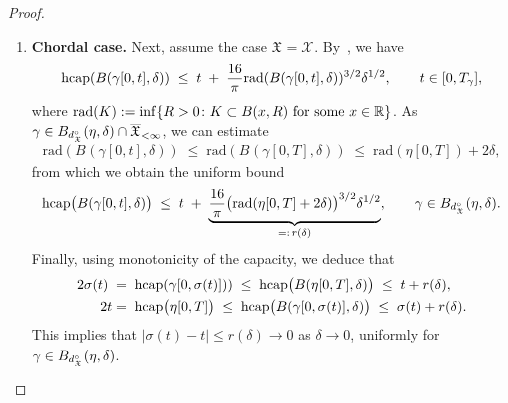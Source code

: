 \documentclass[a4paper, 11pt]{article}
\theoremstyle{definition}
\numberwithin{equation}{section}
\numberwithin{figure}{section}
\newcommand{\id}{\mathrm{\textnormal{id}}}
\newcommand{\Hpaths}[1][]{\mathscr{X}_{#1}} %
\newcommand{\Xpaths}[1][]{\mathfrak{X}_{#1}}
\newcommand{\Xfinpathscl}{\overline{\Xpaths}_{<\infty}}
\newcommand{\Bmetric}[3][]{B_{#1}(#2,#3)}%
\newcommand{\dXpathsUnparam}{d_{\Xpaths}^\circ}%
\newcommand{\rad}{\mathrm{rad}}
\begin{document}
\begin{proof}
\begin{enumerate}[leftmargin=*, label=\textnormal{(\roman*)}]
Thus, we have $g_{A^\gamma_t(r)}(\cdot) = (g_{A(r)} \circ g^\gamma_t)(\cdot) = r^{-1} g^\gamma_t(\cdot)$. 
By monotonicity, we thus obtain
\begin{align*}
e^{\tilde\sigma(t)} = (g^{\tilde\gamma}_{\tilde\sigma(t)})'(0) \le (g_{A^\gamma_{\sigma(t)}(r)})'(0) = r^{-1}e^{\sigma(t)}.
\end{align*}
Taking logarithms of both sides and rearranging yields $\tilde\sigma(t) - \sigma(t) \le - \log r$. 
By symmetry, we have $|\sigma(t)-\tilde\sigma(t)| \le -\log r$. 
Choosing $\tilde\gamma = \eta$ and $\tilde\sigma = \id$ thus gives
\begin{align*}
\sup_{s \in [0,T]}|s - \sigma(s)| 
\; \le \; -\log r 
\quad \xrightarrow{\delta \to 0} \quad 0 , 
\qquad \textnormal{uniformly for } \gamma \in \Bmetric[\dXpathsUnparam]{\eta}{\delta}.
\end{align*}

\item {\bf Chordal case.} 
Next, assume the case $\Xpaths = \Hpaths$. 
By~\cite[Proposition~6.5]{Berestrycki-Norris:Lecture_notes_on_SLE},  we have
\begin{align*}
\hcap(\Bmetric{\gamma[0,t]}{\delta}) 
\; \le \; t  \; + \;  \frac{16}{\pi}\rad(\Bmetric{\gamma[0,t]}{\delta})^{3/2}\delta^{1/2}, \qquad t \in [0,T_\gamma] ,
\end{align*}
where $\rad(K) := \inf\{R > 0 \colon K \subset \Bmetric{x}{R} \textnormal{ for some } x \in \bR\}$. 
As $\gamma \in \smash{\Bmetric[\dXpathsUnparam]{\eta}{\delta} \cap \Xfinpathscl}$,
we can estimate 
\begin{align*}
\rad(\Bmetric{\gamma[0,t]}{\delta}) 
\; \le \; \rad(\Bmetric{\gamma[0,T]}{\delta}) 
\; \le \; \rad(\eta[0,T]) +  2\delta,
\end{align*}
from which we obtain the uniform bound
\begin{align*}
\hcap\big(\Bmetric{\gamma[0,t]}{\delta}\big) 
\; \le \; t  \; + \;  \underbrace{\frac{16}{\pi}\big(\rad(\eta[0,T] + 2\delta)\big)^{3/2}\delta^{1/2}}_{=: \, r(\delta)} 
, \qquad \gamma \in \Bmetric[\dXpathsUnparam]{\eta}{\delta} .
\end{align*}
Finally, using monotonicity of the capacity, we deduce that 
\begin{align*}
2\sigma(t) \; =  \;\; & \hcap(\gamma[0,\sigma(t)])) 
\; \le \; \hcap\big(\Bmetric{\eta[0,T]}{\delta}\big) 
\; \le \; t + r(\delta),
\\
2 t = \;\; & \hcap\big(\eta[0,T]\big) 
\; \le \; \hcap\big(\Bmetric{\gamma[0,\sigma(t)]}{\delta}\big) 
\; \le \; \sigma(t) + r(\delta) .
\end{align*}
This implies that $|\sigma(t)-t| \le r(\delta) \to 0$ as $\delta \to 0$, 
uniformly for $\gamma \in \smash{\Bmetric[\dXpathsUnparam]{\eta}{\delta}}$.
\qedhere
\end{enumerate}
\end{proof}%
\end{document}
